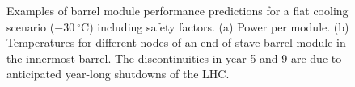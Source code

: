 \begin{figure}[t!]
\centering
{}\quad\quad
{}
\caption{Examples of barrel module performance predictions for a flat cooling scenario ($-30~^\circ$C) including safety factors. (a) Power per module. (b) Temperatures for different nodes of an end-of-stave barrel module in the innermost barrel. The discontinuities in year 5 and 9 are due to anticipated year-long shutdowns of the LHC.}
\label{fig:moduleflatperformance}
\end{figure}

